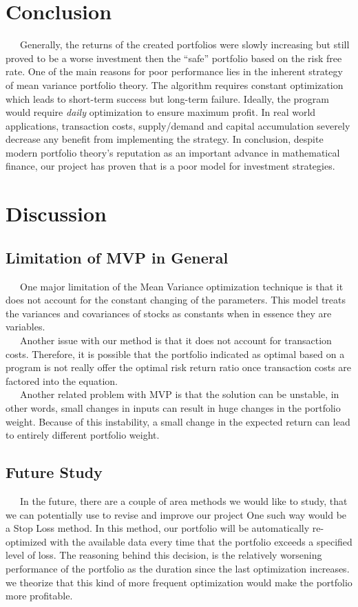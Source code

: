 \documentclass[12pt,titlepage,a4paper]{article}
\begin{document}
\section{Conclusion}
	\ \ \ Generally, the returns of the created portfolios were slowly increasing but still proved to be a worse investment then the “safe” portfolio based on the risk free rate. One of the main reasons for poor performance lies in the inherent strategy of mean variance portfolio theory. The algorithm requires constant optimization which leads to short-term success but long-term failure. Ideally, the program would require \textit{daily} optimization to ensure maximum profit. In real world applications, transaction costs, supply/demand and capital accumulation severely decrease any benefit from implementing the strategy.  In conclusion, despite modern portfolio theory’s reputation as an important advance in mathematical finance, our project has proven that is a poor model for investment strategies.

\section{Discussion}
	\subsection{Limitation of MVP in General}
	\ \ \ One major limitation of the Mean Variance optimization technique is that it does not account for the constant changing of the parameters. This model treats the variances and covariances of stocks as constants when in essence they are variables. \\

	\ \ \ Another issue with our method is that it does not account for transaction costs. Therefore, it is possible that the portfolio indicated as optimal based on a program is not really offer the optimal risk return ratio once transaction costs are factored into the equation.\\

	\ \ \ Another related problem with MVP is that the solution can be unstable, in other words, small changes in inputs can result in huge changes in the portfolio weight. Because of this instability, a small change in the expected return can lead to entirely different portfolio weight. \\

	\subsection{Future Study}
	\ \ \ In the future, there are a couple of area methods we would like to study, that we can potentially use to revise and improve our project
	One such way would be a Stop Loss method. In this method, our portfolio will be automatically re-optimized with the available data every time that the portfolio exceeds a specified level of loss. The reasoning behind this decision, is the relatively worsening performance of the portfolio as the duration since the last optimization increases. we theorize that this kind of more frequent optimization would make the portfolio more profitable.\\
\end{document}
